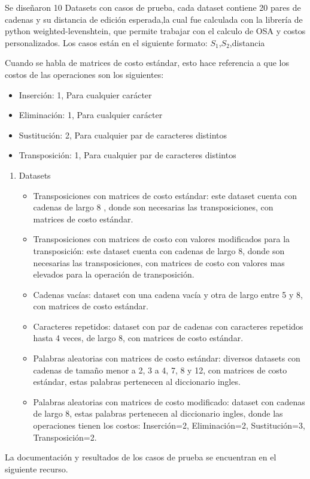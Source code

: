 
Se diseñaron 10 Datasets con casos de prueba, cada dataset contiene 20
pares de cadenas y su distancia de edición esperada,la cual fue calculada
con la librería de python weighted-levenshtein, que permite trabajar con 
el calculo de OSA y costos personalizados. Los casos están en el siguiente formato:
$S_1$,$S_2$,distancia

\begin{mdframed}
    Cuando se habla de matrices de costo estándar, esto hace referencia a que 
    los costos de las operaciones son los siguientes:
    \begin{itemize}
        \item Inserción: 1, Para cualquier carácter
        \item Eliminación: 1, Para cualquier carácter
        \item Sustitución: 2, Para cualquier par de caracteres distintos
        \item Transposición: 1, Para cualquier par de caracteres distintos 
    \end{itemize}
\end{mdframed}    

\begin{enumerate}
    \item Datasets
        \begin{itemize}
            \item Transposiciones con matrices de costo estándar: este dataset cuenta con cadenas de largo 8
            , donde son necesarias las transposiciones, con matrices
            de costo estándar.
            \item Transposiciones con matrices de costo con valores modificados para la transposición: este
            dataset cuenta con cadenas de largo 8, donde son necesarias las transposiciones,
            con matrices de costo con valores mas elevados para la operación de transposición.
            \item Cadenas vacías: dataset con una cadena vacía y otra de largo entre 5 y 8, con
            matrices de costo estándar.
            \item Caracteres repetidos: dataset con par de cadenas con caracteres repetidos
            hasta 4 veces, de largo 8, con matrices de costo estándar.
            \item Palabras aleatorias con matrices de costo estándar: diversos datasets con cadenas de tamaño
                menor a 2, 3 a 4, 7, 8 y 12, con matrices de costo estándar, estas palabras pertenecen
                al diccionario ingles.
            
            \item Palabras aleatorias con matrices de costo modificado: dataset con
            cadenas de largo 8, estas palabras pertenecen
            al diccionario ingles, donde las operaciones tienen los costos: Inserción=2,
            Eliminación=2, Sustitución=3, Transposición=2.
        \end{itemize}

\end{enumerate}

La documentación y resultados de los casos de prueba se encuentran en el siguiente recurso.\cite{Experimentos}

\vfill
